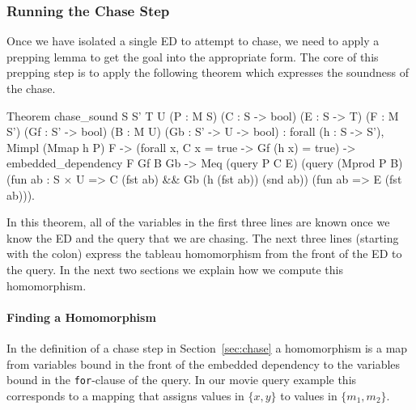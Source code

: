 \documentclass[preprint]{sigplanconf}
\begin{document}
\subsubsection{Running the Chase Step}
\label{sec:chase-step}

Once we have isolated a single ED to attempt to chase, we need to apply a prepping lemma to get the goal into the appropriate form.
The core of this prepping step is to apply the following theorem which expresses the soundness of the chase.
\begin{coq}
Theorem chase_sound {S S' T U}
  (P : M S) (C : S -> bool) (E : S -> T)
  (F : M S') (Gf : S' -> bool) (B : M U) (Gb : S' -> U -> bool)
: forall (h : S -> S'),
    Mimpl (Mmap h P) F ->
    (forall x, C x = true -> Gf (h x) = true) ->
    embedded_dependency F Gf B Gb ->
    Meq (query P C E)
        (query (Mprod P B)
               (fun ab : S $\times$ U => C (fst ab) &&
                                  Gb (h (fst ab)) (snd ab))
               (fun ab => E (fst ab))).
\end{coq}
In this theorem, all of the variables in the first three lines are known once we know the ED and the query that we are chasing.  The next three lines (starting with the colon) express the tableau homomorphism from the front of the ED to the query.
In the next two sections we explain how we compute this homomorphism.

\paragraph{Finding a Homomorphism}
In the definition of a chase step in Section~\ref{sec:chase} a homomorphism is a map from variables bound in the front of the embedded dependency to the variables bound in the {\tt for}-clause of the query.  In our movie query example this corresponds to a mapping that assigns values in $\{x,y\}$ to values in $\{m_1,m_2\}$.
\end{document}
